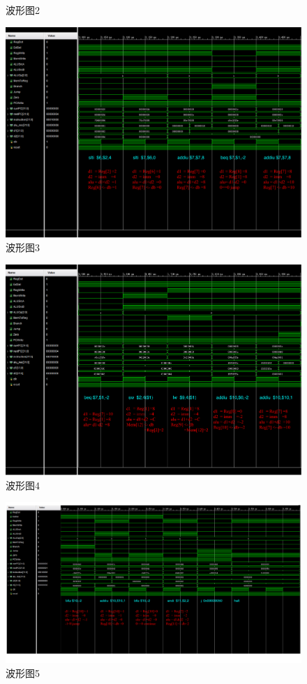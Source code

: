 \documentclass[12pt,UTF8]{ctexart}
\begin{document}
\begin{spacing}{1.1}
\begin{figure}
\caption{波形图2}
\label{fig:wave_2}
\end{figure}
\begin{figure}
\includegraphics[width=\linewidth,trim=0 130 0 0,clip]{fig/FullIns3.pdf}
\caption{波形图3}
\label{fig:wave_3}
\end{figure}
\begin{figure}
\includegraphics[width=\linewidth,trim=0 120 0 0,clip]{fig/FullIns4.pdf}
\caption{波形图4}
\label{fig:wave_4}
\end{figure}
\begin{figure}
\includegraphics[width=\linewidth,trim=0 100 0 0,clip]{fig/FullIns5.pdf}
\caption{波形图5}
\label{fig:wave_5}
\end{figure}


\end{spacing}
\end{document}
